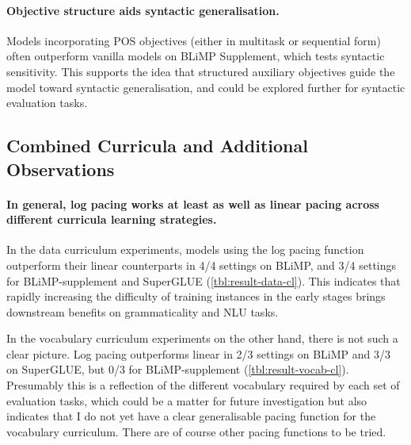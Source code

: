 \paragraph{Objective structure aids syntactic generalisation.}
Models incorporating POS objectives (either in multitask or sequential form) often outperform vanilla models on BLiMP Supplement, which tests syntactic sensitivity. This supports the idea that structured auxiliary objectives guide the model toward syntactic generalisation, and could be explored further for syntactic evaluation tasks.

\subsection{Combined Curricula and Additional Observations}

\paragraph{In general, log pacing works at least as well as linear pacing across different curricula learning strategies.}
In the data curriculum experiments, models using the log pacing function outperform their linear counterparts in 4/4 settings on BLiMP, and 3/4 settings for BLiMP-supplement and SuperGLUE (\cref{tbl:result-data-cl}). This indicates that rapidly increasing the difficulty of training instances in the early stages brings downstream benefits on grammaticality and NLU tasks.

In the vocabulary curriculum experiments on the other hand, there is not such a clear picture. Log pacing outperforms linear in 2/3 settings on BLiMP and 3/3 on SuperGLUE, but 0/3 for BLiMP-supplement (\cref{tbl:result-vocab-cl}).
Presumably this is a reflection of the different vocabulary required by each set of evaluation tasks, which could be a matter for future investigation but also indicates that I do not yet have a clear generalisable pacing function for the vocabulary curriculum. There are of course other pacing functions to be tried.


